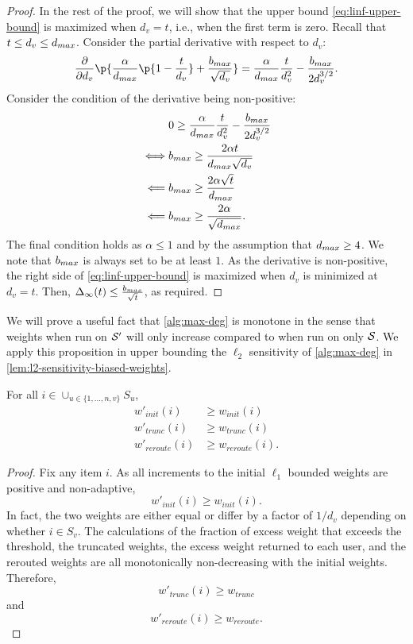 \begin{proof}
In the rest of the proof, we will show that the upper bound \cref{eq:linf-upper-bound} is maximized when $d_v = t$, i.e., when the first term is zero.
Recall that $t \leq d_v \leq d_{max}$.
Consider the partial derivative with respect to $d_v$:
\begin{equation*}
    \frac{\partial}{\partial d_v} \p{\frac{\alpha}{\dmax}\p{1 - \frac{t}{d_v}} + \frac{\bmax}{\sqrt{d_v}}}
    = \frac{\alpha}{\dmax} \frac{t}{d_v^2} - \frac{\bmax}{2d_v^{3/2}}.
\end{equation*}
Consider the condition of the derivative being non-positive:
\begin{align*}
    &0 \geq \frac{\alpha}{d_{max}} \frac{t}{d_v^2} - \frac{b_{max}}{2d_v^{3/2}} \\
    \iff &b_{max} \geq \frac{2\alpha t}{d_{max} \sqrt{d_v}} \\
    \Longleftarrow\; &b_{max} \geq \frac{2\alpha\sqrt{t}}{d_{max}} \\
    \Longleftarrow\; &b_{max} \geq \frac{2\alpha}{\sqrt{d_{max}}}.
\end{align*}
The final condition holds as $\alpha \leq 1$ and by the assumption that $d_{max} \geq 4$. We note that $b_{max}$ is always set to be at least $1$.
As the derivative is non-positive, the right side of \cref{eq:linf-upper-bound} is maximized when $d_v$ is minimized at $d_v=t$.
Then, $\Delta_\infty(t) \leq \frac{b_{max}}{\sqrt{t}}$, as required.
\end{proof}



We will prove a useful fact that \cref{alg:max-deg} is monotone in the sense that weights when run on $\mathcal{S}'$ will only increase compared to when run on only $\mathcal{S}$. We apply this proposition in upper bounding the $\ell_2$ sensitivity of \cref{alg:max-deg} in \cref{lem:l2-sensitivity-biased-weights}.
\begin{proposition}[Monotonicity]\label{lem:monotone}
For all $i \in \cup_{u \in \{1, \ldots, n, v\}} S_u$,
\begin{align*}
    w'_{init}(i) &\geq w_{init}(i) \\
    w'_{trunc}(i) &\geq w_{trunc}(i) \\
    w'_{reroute}(i) &\geq w_{reroute}(i).
\end{align*}
\end{proposition}
\begin{proof}
Fix any item $i$.
As all increments to the initial $\ell_1$ bounded weights are positive and non-adaptive,
\[
    w'_{init}(i) \geq w_{init}(i).
\]
In fact, the two weights are either equal or differ by a factor of $1/d_v$ depending on whether $i \in S_v$.
The calculations of the fraction of excess weight that exceeds the threshold, the truncated weights, the excess weight returned to each user, and the rerouted weights are all monotonically non-decreasing with the initial weights.
Therefore,
\[
    w'_{trunc}(i) \geq w_{trunc}
\]
and
\[
    w'_{reroute}(i) \geq w_{reroute}.
\]
\end{proof}


